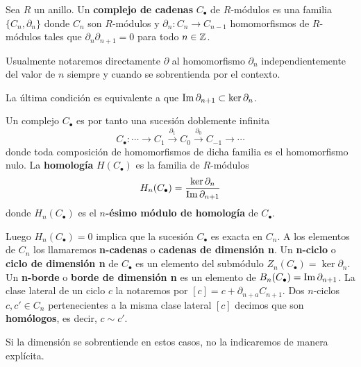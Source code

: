 \begin{definicion}
	Sea $R$ un anillo. Un \textbf{complejo de cadenas} $C_{\bullet}$ de $R$-módulos
	es una familia $\{C_{n}, \partial_{n}\}$ donde $C_{n}$ son $R$-módulos y $\partial
	_{n}: C_{n}\rightarrow C_{n-1}$ homomorfismos de $R$-módulos tales que $\partial
	_{n}\partial_{n+1}= 0$ para todo $n \in \mathbb{Z}$.
\end{definicion}
\begin{nota}
	Usualmente notaremos directamente $\partial$ al homomorfismo $\partial_{n}$ independientemente
	del valor de $n$ siempre y cuando se sobrentienda por el contexto.
\end{nota}
\begin{observacion}
	La última condición es equivalente a que $\operatorname{Im}{\partial_{n+1}}\subset \ker{\partial_n}$.
\end{observacion}
Un complejo $C_{\bullet}$ es por tanto una sucesión doblemente infinita
\[
C_{\bullet}: \cdots \rightarrow C_{1}\xrightarrow{\partial_1}C_{0}\xrightarrow{\partial_0}
C_{-1}\rightarrow \cdots
\]
donde toda composición de homomorfismos de dicha familia es el homomorfismo nulo.
La \textbf{homología} $H(C_{\bullet})$ es la familia de $R$-módulos
\[
H_{n}(C_{\bullet}) = \frac{\ker \partial_{n}}{\operatorname{Im} \partial_{n+1}}
\]
donde $H_{n}(C_{\bullet})$ es el \textbf{$n$-ésimo módulo de homología} de
$C_{\bullet}$.

Luego $H_{n}(C_{\bullet})=0$ implica que la sucesión $C_{\bullet}$ es exacta en
$C_{n}$. A los elementos de $C_{n}$ los llamaremos \textbf{n-cadenas} o \textbf{cadenas
	de dimensión n}. Un \textbf{n-ciclo} o \textbf{ciclo de dimensión n} de
$C_{\bullet}$ es un elemento del submódulo
$Z_{n}(C_{\bullet}) = \ker \partial_{n}$. Un \textbf{n-borde} o \textbf{borde de
	dimensión n} es un elemento de $B_{n}(C_{\bullet})= \operatorname{Im}{\partial_{n+1}}$. La
clase lateral de un ciclo $c$ la notaremos por $[c] = c + \partial_{n+a}C_{n+1}$.
Dos $n$-ciclos $c,c' \in C_{n}$ pertenecientes a la misma clase lateral $[c]$ decimos
que son \textbf{homólogos}, es decir, $c \sim c'$.

\begin{nota}
	Si la dimensión se sobrentiende en estos casos, no la indicaremos de manera
	explícita.
\end{nota}

